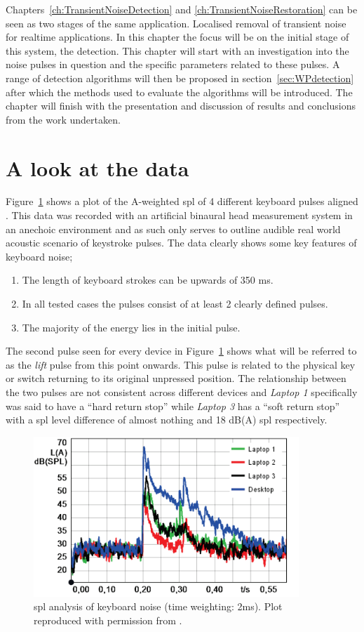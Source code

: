 Chapters~\ref{ch:TransientNoiseDetection} and \ref{ch:TransientNoiseRestoration} can be seen as two stages of the same application. Localised removal of transient noise for realtime applications. In this chapter the focus will be on the initial stage of this system, the detection. This chapter will start with an investigation into the noise pulses in question and the specific parameters related to these pulses. A range of detection algorithms will then be proposed in section~\ref{sec:WPdetection} after which the methods used to evaluate the algorithms will be introduced. The chapter will finish with the presentation and discussion of results and conclusions from the work undertaken.

\section{A look at the data}\label{sec:WPdata}
Figure~\ref{fig:TypingSPLKeyboards} shows a plot of the A-weighted \gls{spl} of 4 different keyboard pulses aligned \cite{Hauswirth2013}. This data was recorded with an artificial binaural head measurement system in an anechoic environment and as such only serves to outline audible real world acoustic scenario of keystroke pulses. The data clearly shows some key features of keyboard noise;
\begin{enumerate}
\item The length of keyboard strokes can be upwards of 350 ms.
\item In all tested cases the pulses consist of at least 2 clearly defined pulses.
\item The majority of the energy lies in the initial pulse.
\end{enumerate}

The second pulse seen for every device in Figure~\ref{fig:TypingSPLKeyboards} shows what will be referred to as the \emph{lift} pulse from this point onwards. This pulse is related to the physical key or switch returning to its original unpressed position. The relationship between the two pulses are not consistent across different devices and \emph{Laptop 1} specifically was said to have a ``hard return stop'' while \emph{Laptop 3} has a ``soft return stop'' with a \gls{spl} level difference of almost nothing and 18 dB(A) \gls{spl} respectively.

\begin{figure}[!] %
\centering
\includegraphics[width=100mm]{TypingSPLKeyboards.png}
\caption{\gls{spl} analysis of keyboard noise (time weighting: 2ms). Plot reproduced with permission from \cite{Hauswirth2013}.}\label{fig:TypingSPLKeyboards}
\end{figure}

